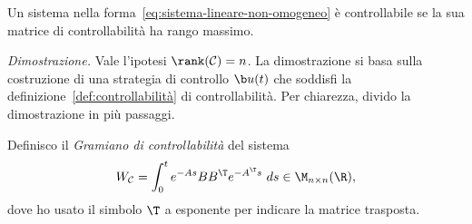 \begin{prop}
    Un sistema nella forma~\eqref{eq:sistema-lineare-non-omogeneo} è controllabile
    se la sua matrice di controllabilità ha rango massimo.
    \label{prop:condizione-controllabilità}
\end{prop}
\emph{Dimostrazione.}
Vale l'ipotesi $\rank(\mathcal C) = n$.
La dimostrazione si basa sulla costruzione di una strategia di controllo $\b u(t)$
che soddisfi la definizione~\ref{def:controllabilità} di controllabilità.
Per chiarezza, divido la dimostrazione in più passaggi.
\begin{steps}
    \item Definisco il \emph{Gramiano di controllabilità} del sistema
        \begin{equation}
            W_{\mathcal C} = \int_0^t e^{-As} BB^{\T} e^{-A^\T s}\ ds \in \M_{n\times n} (\R),
            \label{eq:controllability-gramian}
        \end{equation}
    dove ho usato il simbolo $\T$ a esponente per indicare la matrice trasposta.


\end{steps}
